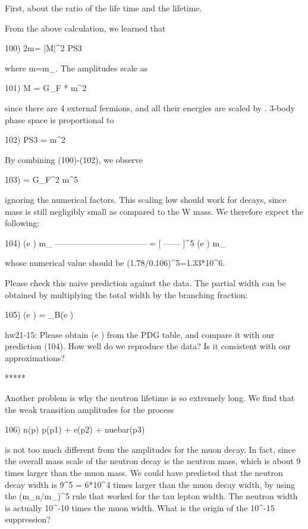 \documentclass[12pt]{article}
\begin{document}
{  First, about the ratio of the \mu life time and the \tau lifetime.

  From the above calculation, we learned that

  100) 2m\Gamma = |M|^2 PS3

  where m=m_\mu.  The amplitudes scale as

  101) M = G_F * m^2

  since there are 4 external fermions, and all their energies are
  scaled by .  3-body phase space is proportional to

  102) PS3 = m^2

  By combining (100)-(102), we observe

  103) \Gamma = G_F^2 m^5

  ignoring the numerical factors.  This scaling low should work for
  \tau decays, since \tau mass is still negligibly small as compared
  to the W mass.  We therefore expect the following:

  104) \Gamma(\tau \to e \nuebar \nutau)     m_\tau
       --------------------------------- = [ ------ ]^5
       \Gamma(\mu  \to e \nuebar \numu )      m_\mu

  whose numerical value should be (1.78/0.106)^5=1.33*10^6.

  Please check this naive prediction against the data.  The partial
  width can be obtained by multiplying the total width by the branching
  fraction:

  105) \Gamma(\tau \to e \nuebar \nutau)
     = \Gamma_\tau * B(\tau \to e \nuebar \nutau)

hw21-15: Please obtain \Gamma(\tau \to e \nuebar \nutau) from the PDG
  table, and compare it with our prediction (104).  How well do we
  reproduce the data?  Is it consistent with our approximations?

                         *****

  Another problem is why the neutron lifetime is so extremely long.  We
  find that the weak transition amplitudes for the process

  106) n(p) \to p(p1) + e(p2) + nuebar(p3)

  is not too much different from the amplitudes for the muon decay.
  In fact, since the overall mass scale of the neutron decay is the
  neutron mass, which is about 9 times larger than the muon mass.
  We could have predicted that the neutron decay width is 9^5 = 6*10^4
  times larger than the muon decay width, by using the (m_n/m_\mu)^5
  rule that worked for the tau lepton width.  The neutron width is
  actually 10^{-10} times the muon width.  What is the origin of the
  10^{-15} suppression?

}
\end{document}
